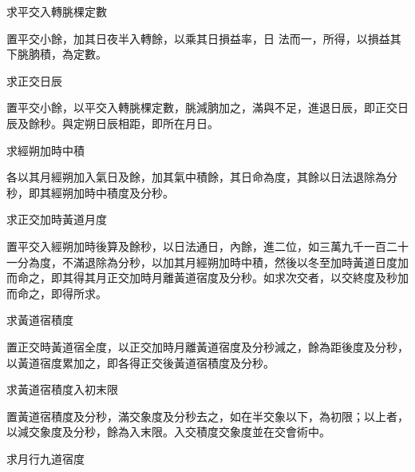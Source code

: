 \begin{pinyinscope}
 求平交入轉朓棵定數



 置平交小餘，加其日夜半入轉餘，以乘其日損益率，日
 法而一，所得，以損益其下朓朒積，為定數。



 求正交日辰



 置平交小餘，以平交入轉朓棵定數，朓減朒加之，滿與不足，進退日辰，即正交日辰及餘秒。與定朔日辰相距，即所在月日。



 求經朔加時中積



 各以其月經朔加入氣日及餘，加其氣中積餘，其日命為度，其餘以日法退除為分秒，即其經朔加時中積度及分秒。



 求正交加時黃道月度



 置平交入經朔加時後算及餘秒，以日法通日，內餘，進二位，如三萬九千一百二十一分為度，不滿退除為分秒，以加其月經朔加時中積，然後以冬至加時黃道日度加而命之，即其得其月正交加時月離黃道宿度及分秒。如求次交者，以交終度及秒加而命之，即得所求。



 求黃道宿積度



 置正交時黃道宿全度，以正交加時月離黃道宿度及分秒減之，餘為距後度及分秒，以黃道宿度累加之，即各得正交後黃道宿積度及分秒。



 求黃道宿積度入初末限



 置黃道宿積度及分秒，滿交象度及分秒去之，如在半交象以下，為初限；以上者，以減交象度及分秒，餘為入末限。入交積度交象度並在交會術中。



 求月行九道宿度




\end{pinyinscope}
